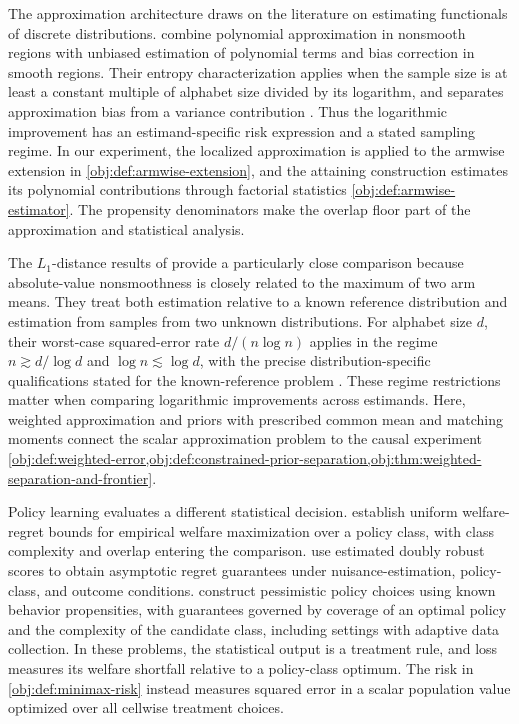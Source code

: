\documentclass[11pt]{article}
\begin{document}
The approximation architecture draws on the literature on estimating functionals of discrete distributions. \citet{JiaoVenkatHanWeissman2015Functionals} combine polynomial approximation in nonsmooth regions with unbiased estimation of polynomial terms and bias correction in smooth regions. Their entropy characterization applies when the sample size is at least a constant multiple of alphabet size divided by its logarithm, and separates approximation bias from a variance contribution \citep[Theorem~1]{JiaoVenkatHanWeissman2015Functionals}. Thus the logarithmic improvement has an estimand-specific risk expression and a stated sampling regime. In our experiment, the localized approximation is applied to the armwise extension in \cref{obj:def:armwise-extension}, and the attaining construction estimates its polynomial contributions through factorial statistics \cref{obj:def:armwise-estimator}. The propensity denominators make the overlap floor part of the approximation and statistical analysis.

The \(L_1\)-distance results of \citet{JiaoHanWeissman2018L1} provide a particularly close comparison because absolute-value nonsmoothness is closely related to the maximum of two arm means. They treat both estimation relative to a known reference distribution and estimation from samples from two unknown distributions. For alphabet size \(d\), their worst-case squared-error rate \(d/(n\log n)\) applies in the regime \(n\gtrsim d/\log d\) and \(\log n\lesssim\log d\), with the precise distribution-specific qualifications stated for the known-reference problem \citep[Theorems~2--4 and~6, Remark~1]{JiaoHanWeissman2018L1}. These regime restrictions matter when comparing logarithmic improvements across estimands. Here, weighted approximation and priors with prescribed common mean and matching moments connect the scalar approximation problem to the causal experiment \cref{obj:def:weighted-error,obj:def:constrained-prior-separation,obj:thm:weighted-separation-and-frontier}.

Policy learning evaluates a different statistical decision. \citet[Assumption~2.1 and Theorems~2.1--2.2]{Kitagawa2018} establish uniform welfare-regret bounds for empirical welfare maximization over a policy class, with class complexity and overlap entering the comparison. \citet[Theorem~1]{Athey2021} use estimated doubly robust scores to obtain asymptotic regret guarantees under nuisance-estimation, policy-class, and outcome conditions. \citet{JinRenYangWang2025Pessimism} construct pessimistic policy choices using known behavior propensities, with guarantees governed by coverage of an optimal policy and the complexity of the candidate class, including settings with adaptive data collection. In these problems, the statistical output is a treatment rule, and loss measures its welfare shortfall relative to a policy-class optimum. The risk in \cref{obj:def:minimax-risk} instead measures squared error in a scalar population value optimized over all cellwise treatment choices.
\end{document}
